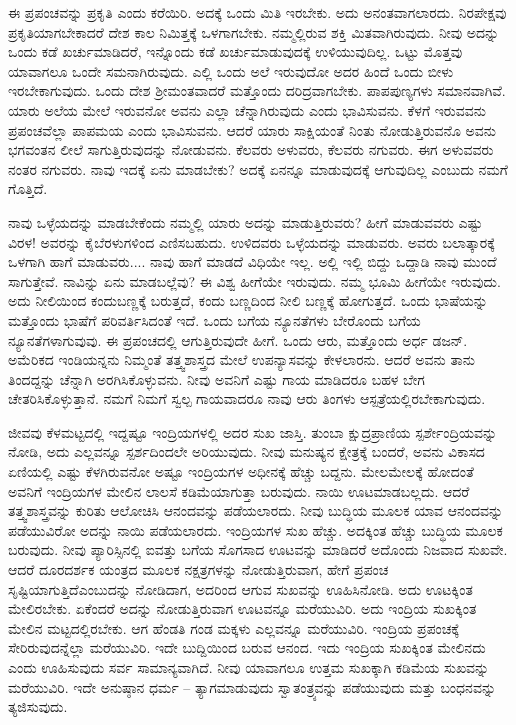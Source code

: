 \vskip 2pt

ಈ ಪ್ರಪಂಚವನ್ನು ಪ್ರಕೃತಿ ಎಂದು ಕರೆಯಿರಿ. ಅದಕ್ಕೆ ಒಂದು ಮಿತಿ ಇರಬೇಕು. ಅದು ಅನಂತವಾಗಲಾರದು. ನಿರಪೇಕ್ಷವು ಪ್ರಕೃತಿಯಾಗಬೇಕಾದರೆ ದೇಶ ಕಾಲ ನಿಮಿತ್ತಕ್ಕೆ ಒಳಗಾಗಬೇಕು. ನಮ್ಮಲ್ಲಿರುವ ಶಕ್ತಿ ಮಿತವಾಗಿರುವುದು. ನೀವು ಅದನ್ನು ಒಂದು ಕಡೆ ಖರ್ಚುಮಾಡಿದರೆ, ಇನ್ನೊಂದು ಕಡೆ ಖರ್ಚುಮಾಡುವುದಕ್ಕೆ ಉಳಿಯುವುದಿಲ್ಲ. ಒಟ್ಟು ಮೊತ್ತವು ಯಾವಾಗಲೂ ಒಂದೇ ಸಮನಾಗಿರುವುದು. ಎಲ್ಲಿ ಒಂದು ಅಲೆ ಇರುವುದೋ ಅದರ ಹಿಂದೆ ಒಂದು ಬೀಳು ಇರಬೇಕಾಗುವುದು. ಒಂದು ದೇಶ ಶ‍್ರೀಮಂತವಾದರೆ ಮತ್ತೊಂದು ದರಿದ್ರವಾಗಬೇಕು. ಪಾಪಪುಣ್ಯಗಳು ಸಮಾನವಾಗಿವೆ. ಯಾರು ಅಲೆಯ ಮೇಲೆ ಇರುವನೋ ಅವನು ಎಲ್ಲಾ ಚೆನ್ನಾಗಿರುವುದು ಎಂದು ಭಾವಿಸುವನು. ಕೆಳಗೆ ಇರುವವನು ಪ್ರಪಂಚವೆಲ್ಲಾ ಪಾಪಮಯ ಎಂದು ಭಾವಿಸುವನು. ಆದರೆ ಯಾರು ಸಾಕ್ಷಿಯಂತೆ ನಿಂತು ನೋಡುತ್ತಿರುವನೊ ಅವನು ಭಗವಂತನ ಲೀಲೆ ಸಾಗುತ್ತಿರುವುದನ್ನು ನೋಡುವನು. ಕೆಲವರು ಅಳುವರು, ಕೆಲವರು ನಗುವರು. ಈಗ ಅಳುವವರು ನಂತರ ನಗುವರು. ನಾವು ಇದಕ್ಕೆ ಏನು ಮಾಡಬೇಕು? ಅದಕ್ಕೆ ಏನನ್ನೂ ಮಾಡುವುದಕ್ಕೆ ಆಗುವುದಿಲ್ಲ ಎಂಬುದು ನಮಗೆ ಗೊತ್ತಿದೆ.

\vskip 2pt

ನಾವು ಒಳ್ಳೆಯದನ್ನು ಮಾಡಬೇಕೆಂದು ನಮ್ಮಲ್ಲಿ ಯಾರು ಅದನ್ನು ಮಾಡುತ್ತಿರುವರು? ಹೀಗೆ ಮಾಡುವವರು ಎಷ್ಟು ವಿರಳ! ಅವರನ್ನು ಕೈಬೆರಳುಗಳಿಂದ ಎಣಿಸಬಹುದು. ಉಳಿದವರು ಒಳ್ಳೆಯದನ್ನು ಮಾಡುವರು. ಅವರು ಬಲಾತ್ಕಾರಕ್ಕೆ ಒಳಗಾಗಿ ಹಾಗೆ ಮಾಡುವರು.... ನಾವು ಹಾಗೆ ಮಾಡದೆ ವಿಧಿಯೇ ಇಲ್ಲ. ಅಲ್ಲಿ ಇಲ್ಲಿ ಬಿದ್ದು ಒದ್ದಾಡಿ ನಾವು ಮುಂದೆ ಸಾಗುತ್ತೇವೆ. ನಾವಿನ್ನು ಏನು ಮಾಡಬಲ್ಲೆವು? ಈ ವಿಶ್ವ ಹೀಗೆಯೇ ಇರುವುದು. ನಮ್ಮ ಭೂಮಿ ಹೀಗೆಯೇ ಇರುವುದು. ಅದು ನೀಲಿಯಿಂದ ಕಂದುಬಣ್ಣಕ್ಕೆ ಬರುತ್ತದೆ, ಕಂದು ಬಣ್ಣದಿಂದ ನೀಲಿ ಬಣ್ಣಕ್ಕೆ ಹೋಗುತ್ತದೆ. ಒಂದು ಭಾಷೆಯನ್ನು ಮತ್ತೊಂದು ಭಾಷೆಗೆ ಪರಿವರ್ತಿಸಿದಂತೆ ಇದೆ. ಒಂದು ಬಗೆಯ ನ್ಯೂನತೆಗಳು ಬೇರೊಂದು ಬಗೆಯ ನ್ಯೂನತೆಗಳಾಗುವುವು. ಈ ಪ್ರಪಂಚದಲ್ಲಿ ಆಗುತ್ತಿರುವುದೇ ಹೀಗೆ. ಒಂದು ಆರು, ಮತ್ತೊಂದು ಅರ್ಧ ಡಜನ್. ಅಮೆರಿಕದ ಇಂಡಿಯನ್ನನು ನಿಮ್ಮಂತೆ ತತ್ತ್ವಶಾಸ್ತ್ರದ ಮೇಲೆ ಉಪನ್ಯಾಸವನ್ನು ಕೇಳಲಾರನು. ಆದರೆ ಅವನು ತಾನು ತಿಂದದ್ದನ್ನು ಚೆನ್ನಾಗಿ ಅರಗಿಸಿಕೊಳ್ಳುವನು. ನೀವು ಅವನಿಗೆ ಎಷ್ಟು ಗಾಯ ಮಾಡಿದರೂ ಬಹಳ ಬೇಗ ಚೇತರಿಸಿಕೊಳ್ಳುತ್ತಾನೆ. ನಮಗೆ ನಿಮಗೆ ಸ್ವಲ್ಪ ಗಾಯವಾದರೂ ನಾವು ಆರು ತಿಂಗಳು ಆಸ್ಪತ್ರೆಯಲ್ಲಿರಬೇಕಾಗುವುದು.

\vskip 2pt

ಜೀವವು ಕೆಳಮಟ್ಟದಲ್ಲಿ ಇದ್ದಷ್ಟೂ ಇಂದ್ರಿಯಗಳಲ್ಲಿ ಅದರ ಸುಖ ಜಾಸ್ತಿ. ತುಂಬಾ ಕ್ಷುದ್ರಪ್ರಾಣಿಯ ಸ್ಪರ್ಶೇಂದ್ರಿಯವನ್ನು ನೋಡಿ, ಅದು ಎಲ್ಲವನ್ನೂ ಸ್ಪರ್ಶದಿಂದಲೇ ಅರಿಯುವುದು. ನೀವು ಮನುಷ್ಯನ ಕ್ಷೇತ್ರಕ್ಕೆ ಬಂದರೆ, ಅವನು ವಿಕಾಸದ ಏಣಿಯಲ್ಲಿ ಎಷ್ಟು ಕೆಳಗಿರುವನೋ ಅಷ್ಟೂ ಇಂದ್ರಿಯಗಳ ಅಧೀನಕ್ಕೆ ಹೆಚ್ಚು ಬದ್ದನು. ಮೇಲಮೇಲಕ್ಕೆ ಹೋದಂತೆ ಅವನಿಗೆ ಇಂದ್ರಿಯಗಳ ಮೇಲಿನ ಲಾಲಸೆ ಕಡಿಮೆಯಾಗುತ್ತಾ ಬರುವುದು. ನಾಯಿ ಊಟಮಾಡಬಲ್ಲದು. ಆದರೆ ತತ್ತ್ವಶಾಸ್ತ್ರವನ್ನು ಕುರಿತು ಆಲೋಚಿಸಿ ಆನಂದವನ್ನು ಪಡೆಯಲಾರದು. ನೀವು ಬುದ್ಧಿಯ ಮೂಲಕ ಯಾವ ಆನಂದವನ್ನು ಪಡೆಯುವಿರೋ ಅದನ್ನು ನಾಯಿ ಪಡೆಯಲಾರದು. ಇಂದ್ರಿಯಗಳ ಸುಖ ಹೆಚ್ಚು. ಅದಕ್ಕಿಂತ ಹೆಚ್ಚು ಬುದ್ಧಿಯ ಮೂಲಕ ಬರುವುದು. ನೀವು ಪ್ಯಾರಿಸ್ಸಿನಲ್ಲಿ ಐವತ್ತು ಬಗೆಯ ಸೊಗಸಾದ ಊಟವನ್ನು ಮಾಡಿದರೆ ಅದೊಂದು ನಿಜವಾದ ಸುಖವೇ. ಆದರೆ ದೂರದರ್ಶಕ ಯಂತ್ರದ ಮೂಲಕ ನಕ್ಷತ್ರಗಳನ್ನು ನೋಡುತ್ತಿರುವಾಗ, ಹೇಗೆ ಪ್ರಪಂಚ ಸೃಷ್ಟಿಯಾಗುತ್ತಿದೆ\break ಎಂಬುದನ್ನು ನೋಡಿದಾಗ, ಅದರಿಂದ ಆಗುವ ಸುಖವನ್ನು ಊಹಿಸಿನೋಡಿ. ಅದು ಊಟಕ್ಕಿಂತ ಮೇಲಿರಬೇಕು. ಏಕೆಂದರೆ ಅದನ್ನು ನೋಡುತ್ತಿರುವಾಗ ಊಟವನ್ನೂ ಮರೆಯುವಿರಿ. ಅದು ಇಂದ್ರಿಯ ಸುಖಕ್ಕಿಂತ ಮೇಲಿನ ಮಟ್ಟದಲ್ಲಿರಬೇಕು. ಆಗ ಹೆಂಡತಿ ಗಂಡ ಮಕ್ಕಳು ಎಲ್ಲವನ್ನೂ ಮರೆಯುವಿರಿ. ಇಂದ್ರಿಯ ಪ್ರಪಂಚಕ್ಕೆ ಸೇರಿರುವುದನ್ನೆಲ್ಲಾ ಮರೆಯುವಿರಿ. ಇದೇ ಬುದ್ದಿಯಿಂದ ಬರುವ ಆನಂದ. ಇದು ಇಂದ್ರಿಯ ಸುಖಕ್ಕಿಂತ ಮೇಲಿನದು ಎಂದು ಊಹಿಸುವುದು ಸರ್ವ ಸಾಮಾನ್ಯವಾಗಿದೆ. ನೀವು ಯಾವಾಗಲೂ ಉತ್ತಮ ಸುಖಕ್ಕಾಗಿ ಕಡಿಮೆಯ ಸುಖವನ್ನು ಮರೆಯುವಿರಿ. ಇದೇ ಅನುಷ್ಠಾನ ಧರ್ಮ – ತ್ಯಾಗಮಾಡುವುದು ಸ್ವಾತಂತ್ರ್ಯವನ್ನು ಪಡೆಯುವುದು ಮತ್ತು ಬಂಧನವನ್ನು ತ್ಯಜಿಸುವುದು.

